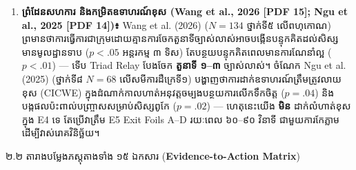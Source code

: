 \documentclass[a4paper,12pt]{article}
\newcommand{\en}[1]{{\TimesEn #1}}
\newcommand{\enbf}[1]{{\TimesEn\bfseries #1}}
\newcommand{\subsec}[1]{%
  \Needspace{1.7cm}%
  \par\vspace{6pt}%
  {\linespread{1.0}\muol\fontsize{11.5pt}{18.5pt}\selectfont #1}%
  \par\vspace{2pt}%
}
\begin{document}
\begin{enumerate}[leftmargin=1.6em, itemsep=3pt, topsep=2pt]
  \item \textbf{ព្រំដែនសហការ និងកម្រិតឧទាហរណ៍ខុស (\en{Wang et al., 2026 [PDF 15]; Ngu et al., 2025 [PDF 14]})៖} \en{Wang et al. (2026)} ($N=134$ ថ្នាក់ទី៥ លើពហុកោណ) ព្រមានថាការធ្វើការជាក្រុមដោយគ្មានការចែកតួនាទីច្បាស់លាស់អាចបង្កើនបន្ទុកគិតដល់សិស្សមានមូលដ្ឋានទាប ($p<.05$ អន្តរកម្ម ៣ ទិស) តែបន្ថយបន្ទុកគិតពេលមានការណែនាំល្អ ($p<.01$) --- ទើប \en{Triad Relay} បែងចែក \textbf{តួនាទី ១--៣} ច្បាស់លាស់។ ចំណែក \en{Ngu et al. (2025)} (ថ្នាក់ទី៨ $N=68$ លើសមីការដឺក្រេទី១) បង្ហាញថាការដាក់ឧទាហរណ៍ត្រឹមត្រូវលាយខុស (\en{CICWE}) ក្នុងដំណាក់កាលហាត់អនុវត្តចម្បងបន្ថយការលើកទឹកចិត្ត ($p=.04$) និងបង្កផលប៉ះពាល់បញ្ច្រាសសម្រាប់សិស្សពូកែ ($p=.02$) --- ហេតុនេះយើង \textbf{មិន} ដាក់លំហាត់ខុសក្នុង \en{E4} ទេ តែប្រើវាត្រឹម \en{E5 Exit Foils A--D} រយៈពេល ៦០--៩០ វិនាទី ជាមួយការកែភ្លាមដើម្បីវាស់រោគវិនិច្ឆ័យ។
\end{enumerate}

\subsec{២.២ តារាងបម្លែងភស្តុតាងទាំង ១៥ ឯកសារ (\enbf{Evidence-to-Action Matrix})}
\end{document}
